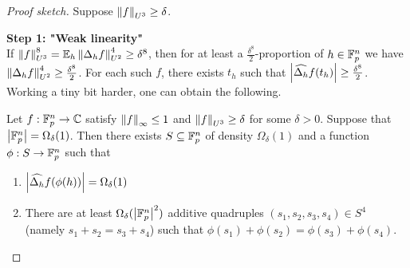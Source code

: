 \documentclass{article}
\begin{document}
\begin{proof}[Proof sketch]
  Suppose $\left\lVert f\right\rVert_{U^3} \ge \delta$.

  {\bf Step 1: "Weak linearity"} \\
  If $\norm f_{U^3}^8 = \E_h \norm{\Delta_h f}_{U^2}^4 \ge \delta^8$, then for at least a $\frac{\delta^8}2$-proportion of $h \in \mathbb F_p^n$ we have $\left\lVert \Delta_h f\right\rVert_{U^2}^4 \ge \frac{\delta^8}2$. For each such $f$, there exists $t_h$ such that $\left\lvert \widehat{\Delta_h}f(t_h)\right\rvert \ge \frac{\delta^8}2$. Working a tiny bit harder, one can obtain the following.

  \begin{nprop}\label{prop:weak-linearity}
    Let $f : \mathbb F_p^n \to \mathbb C$ satisfy $\left\lVert f\right\rVert_\infty \le 1$ and $\left\lVert f\right\rVert_{U^3} \ge \delta$ for some $\delta > 0$. Suppose that $\left\lvert \mathbb F_p^n\right\rvert = \Omega_\delta(1)$. Then there exists $S \subseteq \mathbb F_p^n$ of density $\Omega_\delta(1)$ and a function $\phi : S \to \mathbb F_p^n$ such that
    \begin{enumerate}
      \item $\left\lvert \widehat{\Delta_h}f(\phi(h))\right\rvert = \Omega_\delta(1)$
      \item There are at least $\Omega_\delta(\left\lvert \mathbb F_p^n\right\rvert^2)$ additive quadruples $(s_1, s_2, s_3, s_4) \in S^4$ (namely $s_1 + s_2 = s_3 + s_4$) such that $\phi(s_1) + \phi(s_2) = \phi(s_3) + \phi(s_4)$.
    \end{enumerate}
  \end{nprop}


\end{proof}
\end{document}

